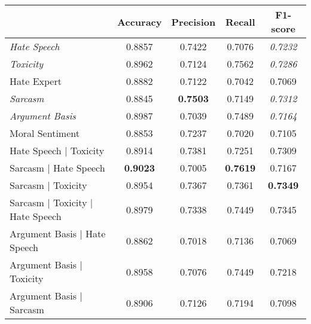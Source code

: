 \begin{table}[h]
  \centering
  \begin{tabular}{l|cccc}
                                                          & Accuracy        & Precision       & Recall          & F1-score        \\ \hline
    \textit{Hate Speech}                                  & 0.8857          & 0.7422          & 0.7076          & \textit{0.7232} \\
    \textit{Toxicity}                                     & 0.8962          & 0.7124          & 0.7562          & \textit{0.7286} \\
    Hate Expert                                           & 0.8882          & 0.7122          & 0.7042          & 0.7069          \\
    \textit{Sarcasm}                                      & 0.8845          & \textbf{0.7503} & 0.7149          & \textit{0.7312} \\
    \textit{Argument Basis}                               & 0.8987          & 0.7039          & 0.7489          & \textit{0.7164}          \\
    Moral Sentiment                                       & 0.8853          & 0.7237          & 0.7020          & 0.7105          \\\hline
    Hate Speech | Toxicity                                & 0.8914          & 0.7381          & 0.7251          & 0.7309          \\
    Sarcasm | Hate Speech                                 & \textbf{0.9023} & 0.7005          & \textbf{0.7619} & 0.7167          \\
    Sarcasm | Toxicity                                    & 0.8954          & 0.7367          & 0.7361          & \textbf{0.7349} \\
    Sarcasm | Toxicity | Hate Speech                      & 0.8979          & 0.7338          & 0.7449          & 0.7345          \\
    Argument Basis | Hate Speech                          & 0.8862          & 0.7018          & 0.7136          & 0.7069          \\
    Argument Basis | Toxicity                             & 0.8958          & 0.7076          & 0.7449          & 0.7218          \\
    Argument Basis | Sarcasm                              & 0.8906          & 0.7126          & 0.7194          & 0.7098          \\

\end{tabular}
\end{table}
